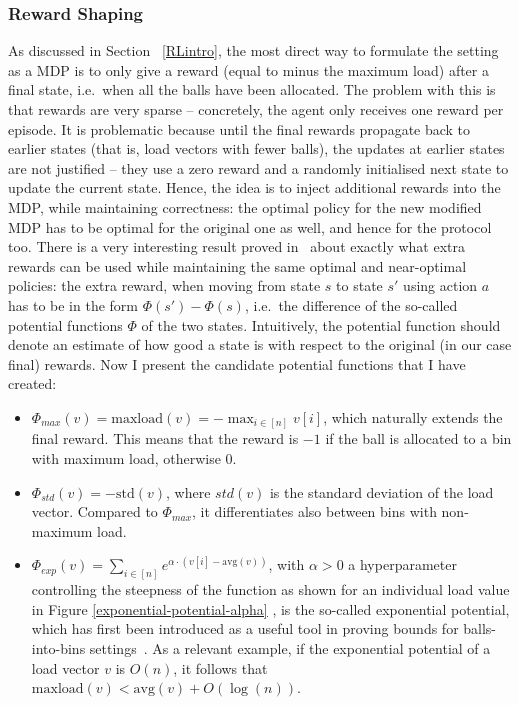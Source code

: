 \subsubsection{Reward Shaping} \label{rewardshaping}

As discussed in Section ~\ref{RLintro}, the most direct way to formulate the \TwoThinning setting as a MDP is to only give a reward (equal to minus the maximum load) after a final state, i.e.\ when all the balls have been allocated. The problem with this is that rewards are very sparse -- concretely, the agent only receives one reward per episode. It is problematic because until the final rewards propagate back to earlier states (that is, load vectors with fewer balls), the updates at earlier states are not justified -- they use a zero reward and a randomly initialised next state to update the current state. Hence, the idea is to inject additional rewards into the MDP, while maintaining correctness: the optimal policy for the new modified MDP has to be optimal for the original one as well, and hence for the \TwoThinning protocol too. There is a very interesting result proved in~\cite{ng1999rewardshaping} about exactly what extra rewards can be used while maintaining the same optimal and near-optimal policies: the extra reward, when moving from state $s$ to state $s'$ using action $a$ has to be in the form $\Phi(s')-\Phi(s)$, i.e.\ the difference of the so-called potential functions $\Phi$ of the two states. Intuitively, the potential function should denote an estimate of how good a state is with respect to the original (in our case final) rewards. Now I present the candidate potential functions that I have created:

\begin{itemize}
    \item
    $\Phi_{max}(v)=\mathrm{maxload}(v)=- \max_{i \in [n]} v[i]$, which naturally extends the final reward. This means that the reward is $-1$ if the ball is allocated to a bin with maximum load, otherwise $0$.
    \item
    $\Phi_{std}(v)=-\mathrm{std}(v)$, where $std(v)$ is the standard deviation of the load vector. Compared to $\Phi_{max}$, it differentiates also between bins with non-maximum load.
    \item
    $\Phi_{exp}(v)=\sum_{i \in [n]} e^{\alpha \cdot  (v[i] - \mathrm{avg}(v))}$, with $\alpha>0$ a hyperparameter controlling the steepness of the function as shown for an individual load value in Figure \ref{exponential-potential-alpha} , is the so-called exponential potential, which has first been introduced as a useful tool in proving bounds for balls-into-bins settings~\cite{ghosh1999exponentialpotential}. As a relevant example, if the exponential potential of a load vector $v$ is $O(n)$, it follows that $\mathrm{maxload}(v) < \mathrm{avg}(v)+O(\log(n))$.
\end{itemize}



